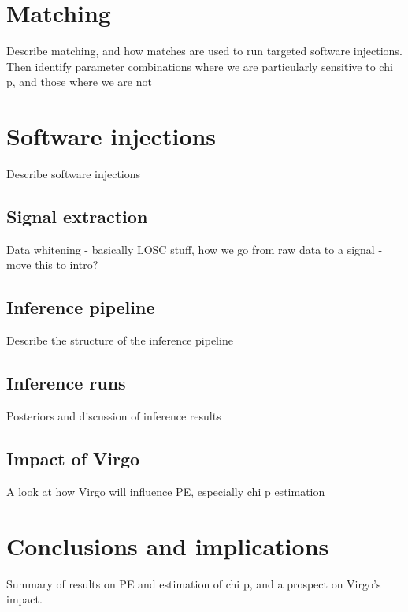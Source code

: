 \documentclass[]{article}
\begin{document}
\section{Matching}
Describe matching, and how matches are used to run targeted software injections.
Then identify parameter combinations where we are particularly sensitive to chi p, and those where we are not
\section{Software injections}
Describe software injections
\subsection{Signal extraction}
Data whitening - basically LOSC stuff, how we go from raw data to a signal - move this to intro?
\subsection{Inference pipeline}
Describe the structure of the inference pipeline
\subsection{Inference runs}
Posteriors and discussion of inference results
\subsection{Impact of Virgo}
A look at how Virgo will influence PE, especially chi p estimation
\section{Conclusions and implications}
Summary of results on PE and estimation of chi p, and a prospect on Virgo's impact.

\end{document}
